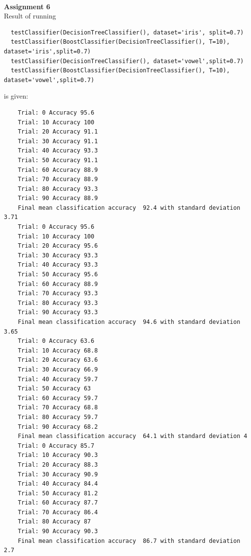 \documentclass[a4paper,10pt]{article}
\begin{document}
$ $\\
\textbf{Assignment 6}
\\
Result of running
\begin{scriptsize}
  \begin{verbatim}
  testClassifier(DecisionTreeClassifier(), dataset='iris', split=0.7)
  testClassifier(BoostClassifier(DecisionTreeClassifier(), T=10), dataset='iris',split=0.7)
  testClassifier(DecisionTreeClassifier(), dataset='vowel',split=0.7)
  testClassifier(BoostClassifier(DecisionTreeClassifier(), T=10), dataset='vowel',split=0.7)
  \end{verbatim}
\end{scriptsize}
is given:
\begin{framed}
  \begin{scriptsize}
    \begin{verbatim}
    Trial: 0 Accuracy 95.6
    Trial: 10 Accuracy 100
    Trial: 20 Accuracy 91.1
    Trial: 30 Accuracy 91.1
    Trial: 40 Accuracy 93.3
    Trial: 50 Accuracy 91.1
    Trial: 60 Accuracy 88.9
    Trial: 70 Accuracy 88.9
    Trial: 80 Accuracy 93.3
    Trial: 90 Accuracy 88.9
    Final mean classification accuracy  92.4 with standard deviation 3.71
    Trial: 0 Accuracy 95.6
    Trial: 10 Accuracy 100
    Trial: 20 Accuracy 95.6
    Trial: 30 Accuracy 93.3
    Trial: 40 Accuracy 93.3
    Trial: 50 Accuracy 95.6
    Trial: 60 Accuracy 88.9
    Trial: 70 Accuracy 93.3
    Trial: 80 Accuracy 93.3
    Trial: 90 Accuracy 93.3
    Final mean classification accuracy  94.6 with standard deviation 3.65
    Trial: 0 Accuracy 63.6
    Trial: 10 Accuracy 68.8
    Trial: 20 Accuracy 63.6
    Trial: 30 Accuracy 66.9
    Trial: 40 Accuracy 59.7
    Trial: 50 Accuracy 63
    Trial: 60 Accuracy 59.7
    Trial: 70 Accuracy 68.8
    Trial: 80 Accuracy 59.7
    Trial: 90 Accuracy 68.2
    Final mean classification accuracy  64.1 with standard deviation 4
    Trial: 0 Accuracy 85.7
    Trial: 10 Accuracy 90.3
    Trial: 20 Accuracy 88.3
    Trial: 30 Accuracy 90.9
    Trial: 40 Accuracy 84.4
    Trial: 50 Accuracy 81.2
    Trial: 60 Accuracy 87.7
    Trial: 70 Accuracy 86.4
    Trial: 80 Accuracy 87
    Trial: 90 Accuracy 90.3
    Final mean classification accuracy  86.7 with standard deviation 2.7
    \end{verbatim}
  \end{scriptsize}
\end{framed}
\end{document}
